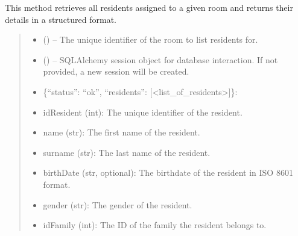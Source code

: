\documentclass[letterpaper,10pt,english]{sphinxmanual}
\begin{document}
\begin{fulllineitems}
\begin{fulllineitems}
\sphinxAtStartPar
This method retrieves all residents assigned to a given room and returns their details
in a structured format.
\begin{quote}\begin{description}
\begin{itemize}
\item {} 
\sphinxAtStartPar
{} () – The unique identifier of the room to list residents for.

\item {} 
\sphinxAtStartPar
{} (\sphinxstyleliteralemphasis{\sphinxupquote{, }}) – SQLAlchemy session object for database interaction.
If not provided, a new session will be created.

\end{itemize}

\sphinxAtStartPar
\begin{description}
\begin{itemize}
\item {} 
\sphinxAtStartPar
\{“status”: “ok”, “residents”: {[}<list\_of\_residents>{]}\}:

\end{itemize}
\begin{description}
\begin{itemize}
\item {} 
\sphinxAtStartPar
idResident (int): The unique identifier of the resident.

\item {} 
\sphinxAtStartPar
name (str): The first name of the resident.

\item {} 
\sphinxAtStartPar
surname (str): The last name of the resident.

\item {} 
\sphinxAtStartPar
birthDate (str, optional): The birthdate of the resident in ISO 8601 format.

\item {} 
\sphinxAtStartPar
gender (str): The gender of the resident.

\item {} 
\sphinxAtStartPar
idFamily (int): The ID of the family the resident belongs to.


\end{itemize}
\end{description}
\end{description}
\end{description}
\end{quote}
\end{fulllineitems}
\end{fulllineitems}
\end{document}
